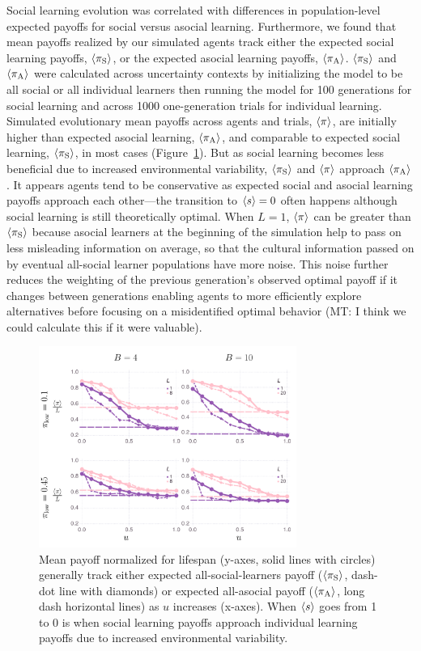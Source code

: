 \documentclass[letterpaper,11.5pt]{scrartcl}
\newcommand{\mt}[1]{{\textcolor{myorange} {({\tiny MT:} #1)}}}
\begin{document}
Social learning evolution was correlated with differences in population-level
expected payoffs for social versus asocial learning. Furthermore, we found that mean
payoffs realized by our simulated agents track either the expected social learning
payoffs, $\langle \pi_\mathrm{S} \rangle$, or the expected asocial learning payoffs, $\langle \pi_\mathrm{A} \rangle$.
$\langle \pi_\mathrm{S} \rangle$ and $\langle \pi_\mathrm{A} \rangle$ were calculated across uncertainty contexts by
initializing the model to be all social or all individual learners then running the
model for 100 generations for social learning and across 1000 one-generation trials
for individual learning.  Simulated evolutionary mean payoffs across agents and
trials, $\langle \pi \rangle$, are initially higher than expected asocial learning, $\langle \pi_\mathrm{A} \rangle$,
and comparable to expected social learning, $\langle \pi_\mathrm{S} \rangle$, in most cases 
(Figure~\ref{fig:payoffs}).  But as social learning becomes less beneficial due to
increased environmental variability, $\langle \pi_\mathrm{S} \rangle$ and $\langle \pi \rangle$ approach $\langle \pi_\mathrm{A} \rangle$.
It appears agents tend
to be conservative as expected social and asocial learning payoffs approach each
other---the transition to $\langle s \rangle = 0$ often happens although social
learning is still theoretically optimal. When $L=1$, $\langle \pi \rangle$ can be greater than
$\langle \pi_\mathrm{S} \rangle$ because asocial learners at the beginning of the simulation help to 
pass on less misleading information on average, so that the cultural information passed on by
eventual all-social learner populations have more noise. This noise further reduces the
weighting of the previous generation's observed optimal payoff if it changes between
generations enabling agents to more efficiently explore alternatives before focusing
on a misidentified optimal behavior \mt{I think we could calculate this if it were
valuable}. 

\begin{figure}
  \caption{Mean payoff normalized for lifespan (y-axes, solid lines with circles)
    generally track either expected all-social-learners payoff ($\langle \pi_\mathrm{S} \rangle$, dash-dot
    line with diamonds) or expected all-asocial payoff ($\langle \pi_\mathrm{A} \rangle$, long dash
    horizontal lines) as $u$ increases (x-axes). When $\langle s \rangle$ goes from 1 to
  0 is when social learning payoffs approach individual learning payoffs due to
increased environmental variability.} 
  \label{fig:payoffs}
\centering
    \includegraphics[width=0.75\textwidth]{Figures/meanNetPayoffs.pdf}
\end{figure}
\end{document}
